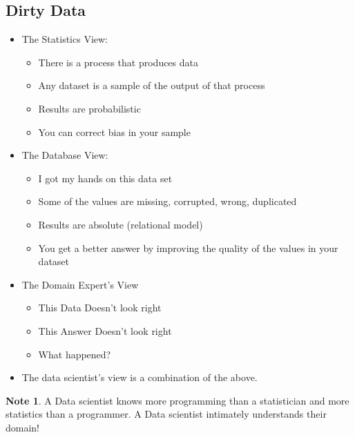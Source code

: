 \documentclass[11pt]{article}
\theoremstyle{definition}
\newtheorem{note}{Note}
\begin{document}
\subsection{Dirty Data}
\begin{itemize}
    \item The Statistics View:
    \begin{itemize}
        \item There is a process that produces data
        \item Any dataset is a sample of the output of that process
        \item Results are probabilistic
        \item You can correct bias in your sample
    \end{itemize}
    \item The Database View:
    \begin{itemize}
        \item I got my hands on this data set
        \item Some of the values are missing, corrupted, wrong, duplicated
        \item Results are absolute (relational model)
        \item You get a better answer by improving the quality of the values in your dataset
    \end{itemize}
    \item The Domain Expert’s View
    \begin{itemize}
        \item This Data Doesn’t look right
        \item This Answer Doesn’t look right
        \item What happened?
    \end{itemize}
    \item The data scientist's view is a combination of the above.
\end{itemize}
\begin{note}
    A Data scientist knows more programming than a statistician
    and more statistics than a programmer.
    A Data scientist intimately understands their domain!
\end{note}
\end{document}
